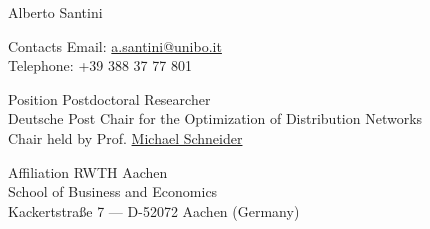 \documentclass[12pt]{article}
\newcommand{\cvImportant}[1]{\textcolor{cvblue}{#1}}
\begin{document}
  

  {\huge\TitleFont Alberto Santini}

  \vspace{2em}

  \begin{paracol}{2}
    {\TitleFont Contacts}
  \switchcolumn
    Email: \href{mailto:a.santini@unibo.it}{a.santini@unibo.it}\\
    Telephone: +39 388 37 77 801
  \end{paracol}

  \vspace{0.5em}

  \begin{paracol}{2}
    {\TitleFont Position}
  \switchcolumn
    \cvImportant{Postdoctoral Researcher}\\
    Deutsche Post Chair for the Optimization of Distribution Networks\\
    Chair held by Prof. \href{http://www.dpor.rwth-aachen.de/}{Michael Schneider}
  \end{paracol}

  \vspace{0.5em}

  \begin{paracol}{2}
    {\TitleFont Affiliation}
  \switchcolumn
    \cvImportant{RWTH Aachen}\\
    School of Business and Economics\\
    Kackertstraße 7 --- D-52072 Aachen (Germany)
  \end{paracol}

  
  
  
  
  
  
  
  
\end{document}

